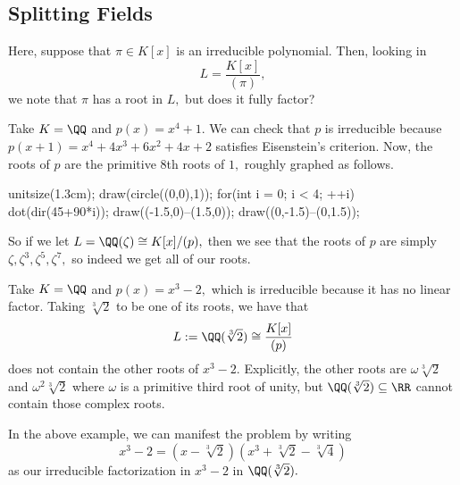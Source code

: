 \documentclass[../notes.tex]{subfiles}
\begin{document}
\subsection{Splitting Fields}
Here, suppose that $\pi\in K[x]$ is an irreducible polynomial. Then, looking in
\[L=\frac{K[x]}{(\pi)},\]
we note that $\pi$ has a root in $L,$ but does it fully factor?
\begin{example}
	Take $K=\QQ$ and $p(x)=x^4+1.$ We can check that $p$ is irreducible because $p(x+1)=x^4+4x^3+6x^2+4x+2$ satisfies Eisenstein's criterion. Now, the roots of $p$ are the primitive $8$th roots of $1,$ roughly graphed as follows.
	\begin{center}
		\begin{asy}
			unitsize(1.3cm);
			draw(circle((0,0),1));
			for(int i = 0; i < 4; ++i)
			{
				dot(dir(45+90*i));
			}
			draw((-1.5,0)--(1.5,0));
			draw((0,-1.5)--(0,1.5));
		\end{asy}
	\end{center}
	So if we let $L=\QQ(\zeta)\cong K[x]/(p),$ then we see that the roots of $p$ are simply $\zeta,\zeta^3,\zeta^5,\zeta^7,$ so indeed we get all of our roots.
\end{example}
\begin{example}
	Take $K=\QQ$ and $p(x)=x^3-2,$ which is irreducible because it has no linear factor. Taking $\sqrt[3]2$ to be one of its roots, we have that
	\[L:=\QQ(\sqrt[3]2)\cong\frac{K[x]}{(p)}\]
	does not contain the other roots of $x^3-2.$ Explicitly, the other roots are $\omega\sqrt[3]2$ and $\omega^2\sqrt[3]2$ where $\omega$ is a primitive third root of unity, but $\QQ(\sqrt[3]2)\subseteq\RR$ cannot contain those complex roots.
\end{example}
In the above example, we can manifest the problem by writing
\[x^3-2=\left(x-\sqrt[3]2\right)\left(x^3+\sqrt[3]2-\sqrt[3]4\right)\]
as our irreducible factorization in $x^3-2$ in $\QQ(\sqrt[3]2).$
\end{document}
